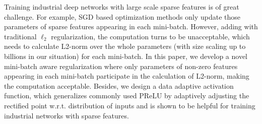 Training industrial deep networks with large scale sparse features is of great challenge. 
For example, SGD based optimization methods only update those parameters of sparse features appearing in each mini-batch. However, adding with traditional $\ell_2$ regularization, the computation turns to be unacceptable, which needs to calculate L2-norm over the whole parameters (with size scaling up to billions in our situation) for each mini-batch. In this paper, we develop a novel mini-batch aware regularization where only parameters of non-zero features appearing in each mini-batch participate in the calculation of L2-norm, making the computation acceptable. Besides, we design a data adaptive activation function, which generalizes commonly used PReLU\cite{ms:prelu} by adaptively adjusting the rectified point w.r.t. distribution of inputs and is shown to be helpful for training industrial networks with sparse features.




